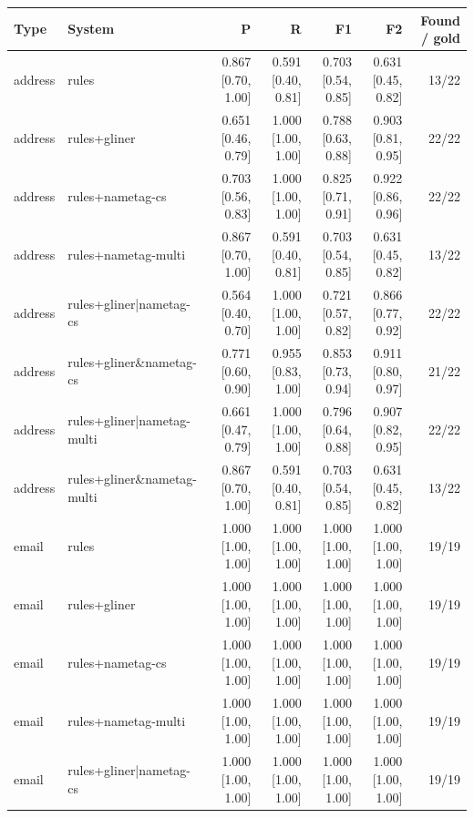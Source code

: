 \providecommand{\ci}[2]{{\scriptsize [#1, #2]}}

\begin{table}[htbp]
\centering
\small
\begin{tabular}{llrrrrr}
\toprule
Type & System & P & R & F1 & F2 & Found / gold \\
\midrule
address & rules & 0.867 \ci{0.70}{1.00} & 0.591 \ci{0.40}{0.81} & 0.703 \ci{0.54}{0.85} & 0.631 \ci{0.45}{0.82} & 13/22 \\
address & rules+gliner & 0.651 \ci{0.46}{0.79} & 1.000 \ci{1.00}{1.00} & 0.788 \ci{0.63}{0.88} & 0.903 \ci{0.81}{0.95} & 22/22 \\
address & rules+nametag-cs & 0.703 \ci{0.56}{0.83} & 1.000 \ci{1.00}{1.00} & 0.825 \ci{0.71}{0.91} & 0.922 \ci{0.86}{0.96} & 22/22 \\
address & rules+nametag-multi & 0.867 \ci{0.70}{1.00} & 0.591 \ci{0.40}{0.81} & 0.703 \ci{0.54}{0.85} & 0.631 \ci{0.45}{0.82} & 13/22 \\
address & rules+gliner|nametag-cs & 0.564 \ci{0.40}{0.70} & 1.000 \ci{1.00}{1.00} & 0.721 \ci{0.57}{0.82} & 0.866 \ci{0.77}{0.92} & 22/22 \\
address & rules+gliner\&nametag-cs & 0.771 \ci{0.60}{0.90} & 0.955 \ci{0.83}{1.00} & 0.853 \ci{0.73}{0.94} & 0.911 \ci{0.80}{0.97} & 21/22 \\
address & rules+gliner|nametag-multi & 0.661 \ci{0.47}{0.79} & 1.000 \ci{1.00}{1.00} & 0.796 \ci{0.64}{0.88} & 0.907 \ci{0.82}{0.95} & 22/22 \\
address & rules+gliner\&nametag-multi & 0.867 \ci{0.70}{1.00} & 0.591 \ci{0.40}{0.81} & 0.703 \ci{0.54}{0.85} & 0.631 \ci{0.45}{0.82} & 13/22 \\
email & rules & 1.000 \ci{1.00}{1.00} & 1.000 \ci{1.00}{1.00} & 1.000 \ci{1.00}{1.00} & 1.000 \ci{1.00}{1.00} & 19/19 \\
email & rules+gliner & 1.000 \ci{1.00}{1.00} & 1.000 \ci{1.00}{1.00} & 1.000 \ci{1.00}{1.00} & 1.000 \ci{1.00}{1.00} & 19/19 \\
email & rules+nametag-cs & 1.000 \ci{1.00}{1.00} & 1.000 \ci{1.00}{1.00} & 1.000 \ci{1.00}{1.00} & 1.000 \ci{1.00}{1.00} & 19/19 \\
email & rules+nametag-multi & 1.000 \ci{1.00}{1.00} & 1.000 \ci{1.00}{1.00} & 1.000 \ci{1.00}{1.00} & 1.000 \ci{1.00}{1.00} & 19/19 \\
email & rules+gliner|nametag-cs & 1.000 \ci{1.00}{1.00} & 1.000 \ci{1.00}{1.00} & 1.000 \ci{1.00}{1.00} & 1.000 \ci{1.00}{1.00} & 19/19 \\

\end{tabular}
\end{table}
